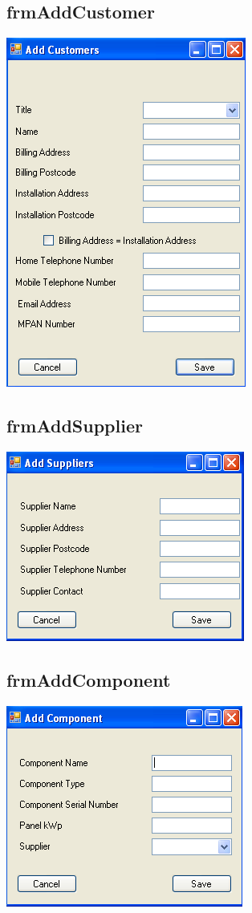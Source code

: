 \subsection{frmAddCustomer}
	\includegraphics[scale=0.5]{frmAddCustomer_scrot}
	
	
\subsection{frmAddSupplier}
	\includegraphics[scale=0.5]{frmAddSupplier_scrot}
	
	
\subsection{frmAddComponent}
	\includegraphics[scale=0.5]{frmAddComponent_scrot}
	

